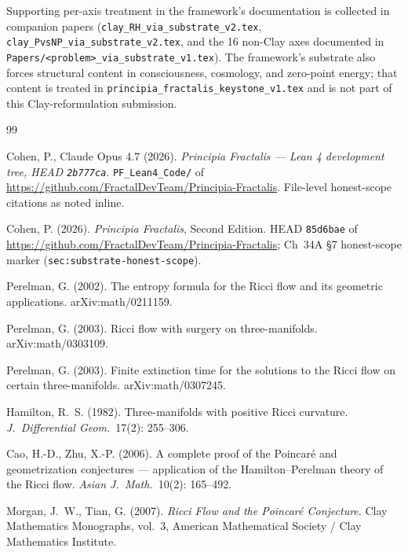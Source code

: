 \documentclass[11pt,a4paper]{article}
\theoremstyle{plain}
\theoremstyle{definition}
\begin{document}
\medskip

\noindent
Supporting per-axis treatment in the framework's documentation
is collected in companion papers
(\texttt{clay\_RH\_via\_substrate\_v2.tex},
\texttt{clay\_PvsNP\_via\_substrate\_v2.tex}, and the 16 non-Clay
axes documented in
\texttt{Papers/<problem>\_via\_substrate\_v1.tex}). The
framework's substrate also forces structural content in
consciousness, cosmology, and zero-point energy; that content is
treated in \texttt{principia\_fractalis\_keystone\_v1.tex} and is
not part of this Clay-reformulation submission.

\begin{thebibliography}{99}

Cohen, P., Claude Opus 4.7 (2026). \emph{Principia Fractalis ---
Lean 4 development tree, HEAD \texttt{2b777ca}}.
\texttt{PF\_Lean4\_Code/} of
\url{https://github.com/FractalDevTeam/Principia-Fractalis}.
File-level honest-scope citations as noted inline.

Cohen, P. (2026). \emph{Principia Fractalis}, Second Edition.
HEAD \texttt{85d6bae} of
\url{https://github.com/FractalDevTeam/Principia-Fractalis};
Ch~34A \S7 honest-scope marker
(\texttt{sec:substrate-honest-scope}).

Perelman, G. (2002). The entropy formula for the Ricci flow and
its geometric applications. arXiv:math/0211159.

Perelman, G. (2003). Ricci flow with surgery on three-manifolds.
arXiv:math/0303109.

Perelman, G. (2003). Finite extinction time for the solutions to
the Ricci flow on certain three-manifolds. arXiv:math/0307245.

Hamilton, R.~S. (1982). Three-manifolds with positive Ricci
curvature. \emph{J.\ Differential Geom.}\ 17(2): 255--306.

Cao, H.-D., Zhu, X.-P. (2006). A complete proof of the Poincar\'e
and geometrization conjectures --- application of the
Hamilton--Perelman theory of the Ricci flow.
\emph{Asian J.\ Math.}\ 10(2): 165--492.

Morgan, J.~W., Tian, G. (2007). \emph{Ricci Flow and the
Poincar\'e Conjecture}. Clay Mathematics Monographs, vol.~3,
American Mathematical Society / Clay Mathematics Institute.


\end{thebibliography}
\end{document}
